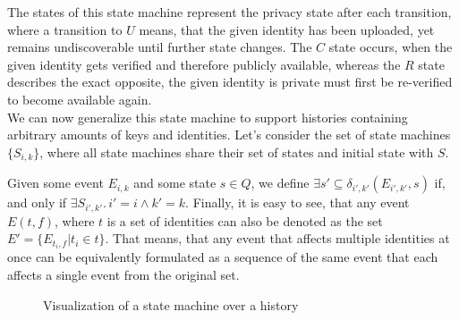 The states of this state machine represent the privacy state after each transition, where a transition to \(U\) means, that the given identity has been uploaded, yet remains undiscoverable until further state changes. The \(C\) state occurs, when the given identity gets verified and therefore publicly available, whereas the \(R\) state describes the exact opposite, the given identity is private must first be re-verified to become available again.
\\

We can now generalize this state machine to support histories containing arbitrary amounts of keys and identities. Let's consider the set of state machines \(\{S_{i,k}\}\), where all state machines share their set of states and initial state with \(S\). 

Given some event \(E_{i,k}\) and some state \(s \in Q\), we define \( \exists {s'} \subseteq \delta_{i',k'}(E_{i',k'},s) \) if, and only if \( \exists S_{i',k'} .\, i' = i \wedge k' = k\).
Finally, it is easy to see, that any event \(E(t,f)\), where \(t\) is a set of identities can also be denoted as the set \(E' = \{E_{t_i,f} | t_i \in t\} \). That means, that any event that affects multiple identities at once can be equivalently formulated as a sequence of the same event that each affects a single event from the original set.

\begin{figure}[H]
    \centering
    \caption{Visualization of a state machine over a history}
\end{figure}

